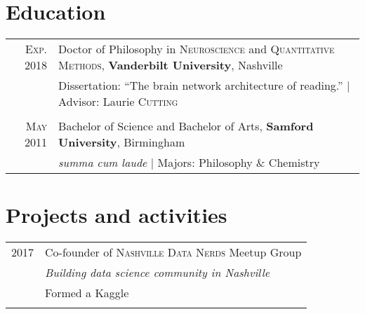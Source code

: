 \documentclass[a4paper,10pt]{article}
\begin{document}
\section{Education}
\begin{tabular}{rl}	

    \textsc{Exp.} 2018 & Doctor of Philosophy in \textsc{Neuroscience} and \textsc{Quantitative Methods}, \textbf{Vanderbilt University}, Nashville\\
    & Dissertation: ``The brain network architecture of reading.'' | \small Advisor: Laurie \textsc{Cutting}\\\\
    
    \textsc{May} 2011 & Bachelor of Science and Bachelor of Arts, \textbf{Samford University}, Birmingham\\
    & \small\emph{summa cum laude} | Majors: Philosophy \& Chemistry\\

\end{tabular}


\section{Projects and activities}
\begin{tabular}{rl}
    \textsc{2017} & Co-founder of \textsc{Nashville Data Nerds} Meetup Group \\
    & \emph{Building data science community in Nashville}\\
    & \footnotesize{Formed a Kaggle }\\
    \multicolumn{2}{c}{} \\
\end{tabular}
\end{document}
